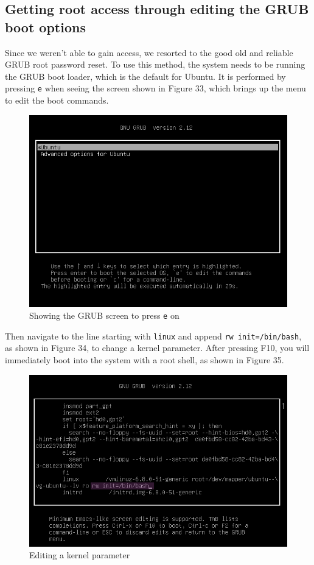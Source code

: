 \documentclass[a4paper]{article}
\newcommand{\abc}{\hfill \break}
\begin{document}
\subsection{Getting root access through editing the GRUB boot options}
Since we weren't able to gain access, we resorted to the good old and reliable GRUB root password reset. \cite{root-grub}
To use this method, the system needs to be running the GRUB boot loader, which is the default for Ubuntu.\abc
It is performed by pressing \texttt{e} when seeing the screen shown in Figure 33, which brings up the menu to edit the boot commands.
\begin{figure}[h]
	\includegraphics[scale=0.51]{images/pe.png}
	\centering
	\caption{Showing the GRUB screen to press \texttt{e} on}
\end{figure}\abc
Then navigate to the line starting with \texttt{linux} and append \texttt{rw init=/bin/bash}, as shown in Figure 34, to change a kernel parameter. After pressing F10, you will immediately boot into the system with a root shell, as shown in Figure 35.\newpage
\begin{figure}[ht]
	\includegraphics[scale=0.51]{images/rw+.png}
	\centering
	\caption{Editing a kernel parameter}
\end{figure}
\end{document}
